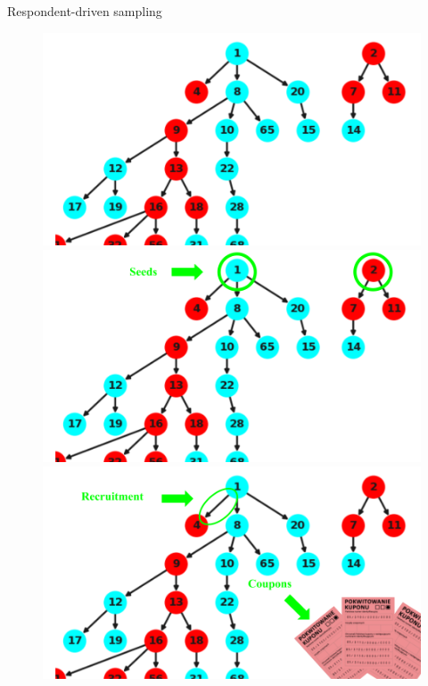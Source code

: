 \documentclass{beamer}
\begin{document}
\begin{frame}{Respondent-driven sampling}
  \begin{figure}
    \begin{overprint}
    \includegraphics[width=\textwidth]{../../images/graph-rds-harvard-1.png}
    \includegraphics[width=\textwidth]{../../images/graph-rds-harvard-2-english.png}
    \includegraphics[width=\textwidth]{../../images/graph-rds-harvard-3-english.png}

\end{overprint}
\end{figure}
\end{frame}
\end{document}

